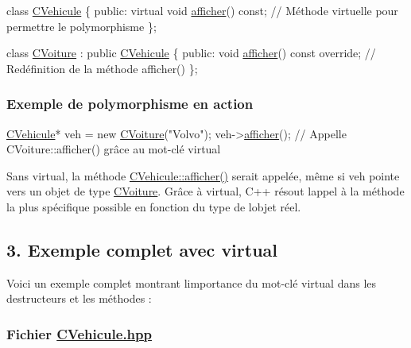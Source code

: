 \begin{DoxyCode}
\textcolor{keyword}{class }\hyperlink{classCVehicule}{CVehicule} \{
\textcolor{keyword}{public}:
    \textcolor{keyword}{virtual} \textcolor{keywordtype}{void} \hyperlink{classCVehicule_a7d62fa555949feb096b4f56781164895}{afficher}() \textcolor{keyword}{const}; \textcolor{comment}{// Méthode virtuelle pour permettre le polymorphisme}
\};

\textcolor{keyword}{class }\hyperlink{classCVoiture}{CVoiture} : \textcolor{keyword}{public} \hyperlink{classCVehicule}{CVehicule} \{
\textcolor{keyword}{public}:
    \textcolor{keywordtype}{void} \hyperlink{classCVehicule_a7d62fa555949feb096b4f56781164895}{afficher}() \textcolor{keyword}{const override}; \textcolor{comment}{// Redéfinition de la méthode afficher()}
\};
\end{DoxyCode}


\subsubsection*{Exemple de polymorphisme en action}


\begin{DoxyCode}
\hyperlink{classCVehicule}{CVehicule}* veh = \textcolor{keyword}{new} \hyperlink{classCVoiture}{CVoiture}(\textcolor{stringliteral}{"Volvo"});
veh->\hyperlink{classCVehicule_a7d62fa555949feb096b4f56781164895}{afficher}(); \textcolor{comment}{// Appelle CVoiture::afficher() grâce au mot-clé virtual}
\end{DoxyCode}


Sans {\ttfamily virtual}, la méthode {\ttfamily \hyperlink{classCVehicule_a7d62fa555949feb096b4f56781164895}{C\+Vehicule\+::afficher()}} serait appelée, même si {\ttfamily veh} pointe vers un objet de type {\ttfamily \hyperlink{classCVoiture}{C\+Voiture}}. Grâce à {\ttfamily virtual}, C++ résout l\textquotesingle{}appel à la méthode la plus spécifique possible en fonction du type de l\textquotesingle{}objet réel.

\subsection*{3. Exemple complet avec {\ttfamily virtual}}

Voici un exemple complet montrant l\textquotesingle{}importance du mot-\/clé {\ttfamily virtual} dans les destructeurs et les méthodes \+:

\subsubsection*{Fichier {\ttfamily \hyperlink{CVehicule_8hpp}{C\+Vehicule.\+hpp}}}


